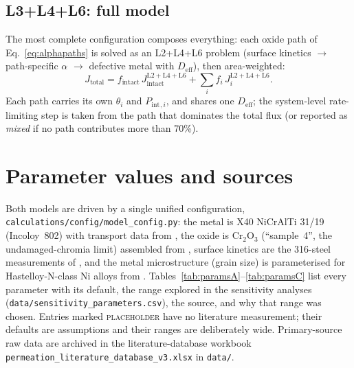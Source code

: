 \documentclass[11pt,a4paper]{article}
\newcommand{\Pint}{P_{\mathrm{int}}}
\newcommand{\Deff}{D_{\mathrm{eff}}}
\newcommand{\code}[1]{\texttt{#1}}
\begin{document}
\subsection{L3+L4+L6: full model}

The most complete configuration composes everything: each oxide path of
Eq.~\eqref{eq:alphapaths} is solved as an L2+L4+L6 problem (surface kinetics
$\rightarrow$ path-specific $\alpha$ $\rightarrow$ defective metal with
$\Deff$), then area-weighted:
\begin{equation}
  J_{\mathrm{total}} = f_{\mathrm{intact}}\,J_{\mathrm{intact}}^{\mathrm{L2+L4+L6}}
                     + \sum_i f_i\, J_i^{\mathrm{L2+L4+L6}}.
  \label{eq:L346}
\end{equation}
Each path carries its own $\theta_i$ and $\Pint{}_{,i}$, and shares one $\Deff$; the
system-level rate-limiting step is taken from the path that dominates the
total flux (or reported as \emph{mixed} if no path contributes more than
70\%).

\section{Parameter values and sources}
\label{sec:parameters}

Both models are driven by a single unified configuration,
\code{calculations/config/model\_config.py}: the metal is X40 NiCrAlTi 31/19
(Incoloy~802) with transport data from \citet{schmidt1985}, the oxide is
$\mathrm{Cr_2O_3}$ (``sample~4'', the undamaged-chromia limit) assembled from
\citet{nemanic2023,stover1986,chen2011}, surface kinetics are the 316-steel
measurements of \citet{grant1988}, and the metal microstructure (grain size)
is parameterised for Hastelloy-N-class Ni alloys from \citet{zhu2021}. Tables~\ref{tab:paramsA}--\ref{tab:paramsC}
list every parameter with its default, the range explored in the sensitivity
analyses (\code{data/sensitivity\_parameters.csv}), the source, and why that
range was chosen. Entries marked \textsc{placeholder} have no literature
measurement; their defaults are assumptions and their ranges are deliberately
wide. Primary-source raw data are archived in the literature-database
workbook \code{permeation\_literature\_database\_v3.xlsx} in \code{data/}.
\end{document}
